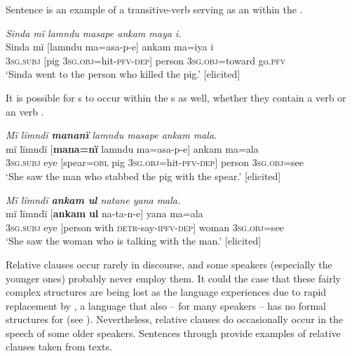 Sentence  is an example of a transitive-verb  serving as an  within the .

\ea%
    \label{ex:complex:89}
          \textit{Sinda mï lamndu masape ankam maya i.}\\
\gll    Sinda  mï      [lamndu  ma=asa-p-e]      ankam ma=iya      i\\
    [name]  3\textsc{sg.subj}  [pig    3\textsc{sg.obj}=hit-\textsc{pfv-dep]}  person    3\textsc{sg.obj}=toward  go.\textsc{pfv}\\
\glt `Sinda went to the person who killed the pig.’ [elicited]
\z

It is possible for s to occur within the  s as well, whether they contain a  verb  or an  verb .

\ea%
    \label{ex:complex:90}
          \textit{Mï lïmndï \textbf{mananï} lamndu masape ankam mala.}\\
\gll    mï      lïmndï  [\textbf{mana=nï}    lamndu  ma=asa-p-e] ankam  ma=ala\\
    3\textsc{sg.subj}  eye    [spear=\textsc{obl}  pig      3\textsc{sg.obj}=hit-\textsc{pfv-dep]}    person  3\textsc{sg.obj}=see\\
\glt `She saw the man who stabbed the pig with the spear.’ [elicited]
\z

\ea%
    \label{ex:complex:91}
          \textit{Mï lïmndï \textbf{ankam ul} natane yana mala.}\\
\gll    mï      lïmndï  [\textbf{ankam}  \textbf{ul}    na-ta-n-e]        yana   ma=ala\\
    3\textsc{sg.subj}  eye    [person  with  \textsc{detr-}say\textsc{{}-ipfv-dep]} woman    \textsc{3sg.obj}=see\\
\glt `She saw the woman who is talking with the man.’ [elicited]
\z



Relative clauses occur rarely in discourse, and some speakers (especially the younger ones) probably never employ them. It could the case that these fairly complex  structures are being lost as the language experiences  due to rapid replacement by , a language that also -- for many speakers -- has no formal structures for  (see ). Nevertheless, relative clauses do occasionally occur in the speech of some older speakers. Sentences  through  provide examples of relative clauses taken from texts.

